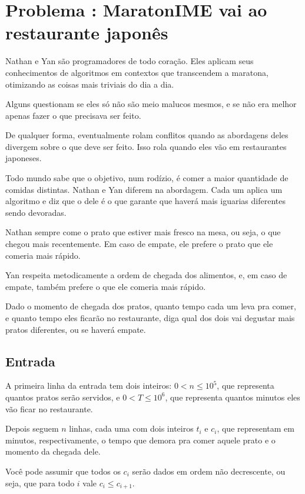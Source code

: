 \section*{Problema \proxLetra: MaratonIME vai ao restaurante japonês}

Nathan e Yan são programadores de todo coração. Eles aplicam seus
conhecimentos de algoritmos em contextos que transcendem a maratona,
otimizando as coisas mais triviais do dia a dia.

Alguns questionam se eles só não são meio malucos mesmos, e se não 
era melhor apenas fazer o que precisava ser feito.

De qualquer forma, eventualmente rolam conflitos quando as abordagens
deles divergem sobre o que deve ser feito. Isso rola quando eles vão
em restaurantes japoneses.

Todo mundo sabe que o objetivo, num rodízio, é comer a maior quantidade
de comidas distintas. Nathan e Yan diferem na abordagem. Cada um aplica
um algoritmo e diz que o dele é o que garante que haverá mais iguarias
diferentes sendo devoradas.

Nathan sempre come o prato que estiver mais fresco na mesa, ou seja,
o que chegou mais recentemente. Em caso de empate, ele prefere o prato
que ele comeria mais rápido.

Yan respeita metodicamente a ordem de chegada dos alimentos, e, em
caso de empate, também prefere o que ele comeria mais rápido.

Dado o momento de chegada dos pratos, quanto tempo cada um leva pra comer,
e quanto tempo eles ficarão no restaurante, diga qual dos dois vai degustar
mais pratos diferentes, ou se haverá empate.
\subsection*{Entrada}
\textoDiversasInstanciasEOF

A primeira linha da entrada tem dois inteiros: $0 < n \leq 10^5$, que representa
quantos pratos serão servidos, e $0 < T \leq 10^6$, que representa quantos
minutos eles vão ficar no restaurante.

Depois seguem $n$ linhas, cada uma com dois inteiros $t_i$ e $c_i$, que
representam em minutos, respectivamente, o tempo que demora pra comer 
aquele prato e o momento da chegada dele.

Você pode assumir que todos os $c_i$ serão dados em ordem não decrescente, ou
seja, que para todo $i$ vale $c_i \leq c_{i+1}$.

